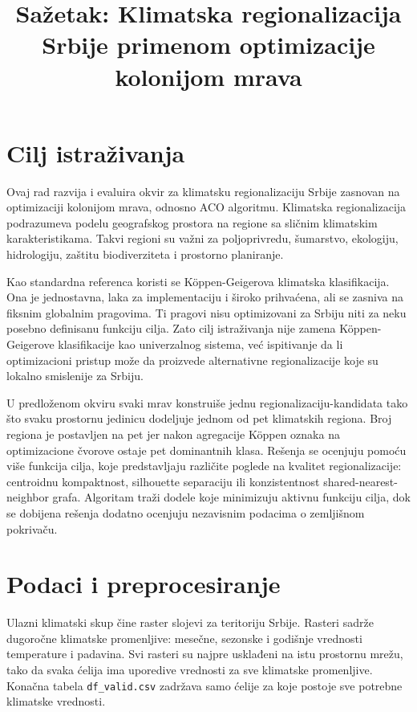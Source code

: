 \documentclass[11pt]{article}
\title{Sažetak: Klimatska regionalizacija Srbije primenom optimizacije kolonijom mrava}
\date{}
\begin{document}
\maketitle

\section*{Cilj istraživanja}

Ovaj rad razvija i evaluira okvir za klimatsku regionalizaciju Srbije zasnovan na optimizaciji kolonijom mrava, odnosno ACO algoritmu. Klimatska regionalizacija podrazumeva podelu geografskog prostora na regione sa sličnim klimatskim karakteristikama. Takvi regioni su važni za poljoprivredu, šumarstvo, ekologiju, hidrologiju, zaštitu biodiverziteta i prostorno planiranje.

Kao standardna referenca koristi se Köppen-Geigerova klimatska klasifikacija. Ona je jednostavna, laka za implementaciju i široko prihvaćena, ali se zasniva na fiksnim globalnim pragovima. Ti pragovi nisu optimizovani za Srbiju niti za neku posebno definisanu funkciju cilja. Zato cilj istraživanja nije zamena Köppen-Geigerove klasifikacije kao univerzalnog sistema, već ispitivanje da li optimizacioni pristup može da proizvede alternativne regionalizacije koje su lokalno smislenije za Srbiju.

U predloženom okviru svaki mrav konstruiše jednu regionalizaciju-kandidata tako što svaku prostornu jedinicu dodeljuje jednom od pet klimatskih regiona. Broj regiona je postavljen na pet jer nakon agregacije Köppen oznaka na optimizacione čvorove ostaje pet dominantnih klasa. Rešenja se ocenjuju pomoću više funkcija cilja, koje predstavljaju različite poglede na kvalitet regionalizacije: centroidnu kompaktnost, silhouette separaciju ili konzistentnost shared-nearest-neighbor grafa. Algoritam traži dodele koje minimizuju aktivnu funkciju cilja, dok se dobijena rešenja dodatno ocenjuju nezavisnim podacima o zemljišnom pokrivaču.

\section*{Podaci i preprocesiranje}

Ulazni klimatski skup čine raster slojevi za teritoriju Srbije. Rasteri sadrže dugoročne klimatske promenljive: mesečne, sezonske i godišnje vrednosti temperature i padavina. Svi rasteri su najpre usklađeni na istu prostornu mrežu, tako da svaka ćelija ima uporedive vrednosti za sve klimatske promenljive. Konačna tabela \texttt{df\_valid.csv} zadržava samo ćelije za koje postoje sve potrebne klimatske vrednosti.
\end{document}
